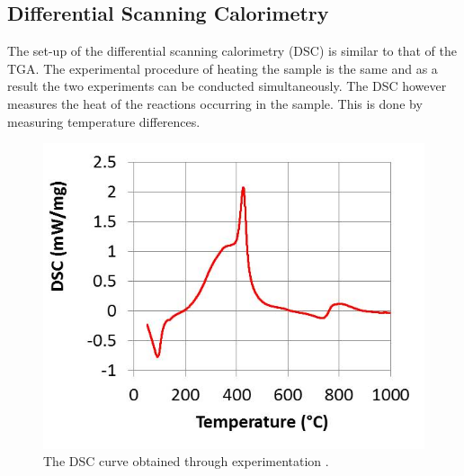 \subsection{Differential Scanning Calorimetry}
The set-up of the differential scanning calorimetry (DSC) is similar to that of the TGA. The experimental procedure of heating the sample is the same and as a result the two experiments can be conducted simultaneously. The DSC however measures the heat of the reactions occurring in the sample. This is done by measuring temperature differences\cite{thermal}.\\  
\begin{figure}
\centering
\includegraphics[scale=1]{figures/DSC_exp.jpg}
\caption{The DSC curve obtained through experimentation \cite{Ray19}.}
\label{DSC_exp}
\end{figure} 

